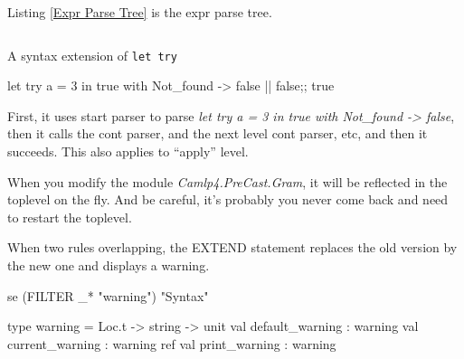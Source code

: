 Listing \ref{Expr Parse Tree} is the expr parse tree.

\inputminted[fontsize=\scriptsize]{ocaml}{code/camlp4/expr_parse_tree/first.ml}


A syntax extension of \verb|let try|

\begin{ocamlcode}
let try a = 3 in true with Not_found -> false || false;;
true  
\end{ocamlcode}

First, it uses start parser to parse \textit{let try a = 3 in true
  with Not\_found -> false}, then it calls the cont parser, and the
next level cont parser, etc, and then it succeeds. This also applies
to ``apply'' level.


When you modify the module \textit{Camlp4.PreCast.Gram}, it will be
reflected in the toplevel on the fly. And be careful, it's probably you never come back and need to restart the toplevel.

When two rules overlapping, the EXTEND statement replaces the
old version by the new one and displays a warning. 

\begin{ocamlcode}
se (FILTER _* "warning") "Syntax"
\end{ocamlcode}

\begin{ocamlcode}
type warning = Loc.t -> string -> unit
val default_warning : warning
val current_warning : warning ref
val print_warning : warning
\end{ocamlcode}
  




